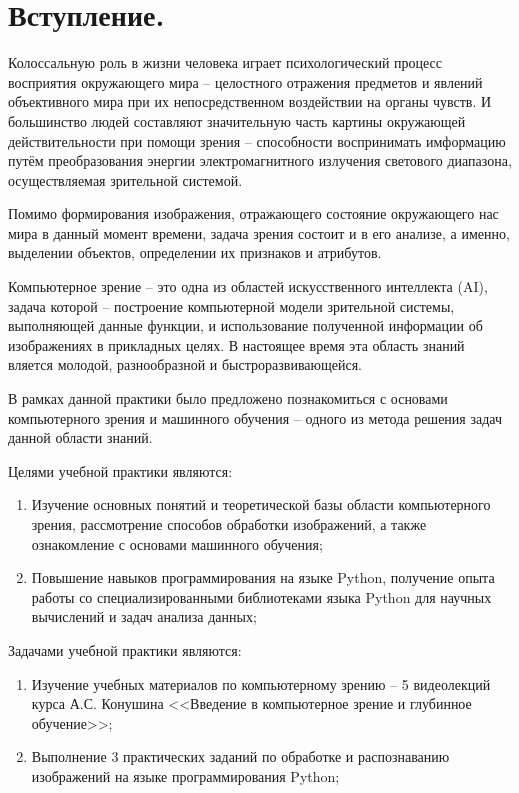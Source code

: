 \documentclass[a4paper, 12pt]{article}
\begin{document}
{
\hypersetup{linkcolor=black}
\tableofcontents
}

\newpage

\section*{Вступление.}
%

Колоссальную роль в жизни человека играет психологический процесс восприятия окружающего мира --  целостного отражения предметов и явлений объективного мира при их непосредственном воздействии на органы чувств. И большинство людей составляют значительную часть картины окружающей действительности при помощи зрения -- способности воспринимать имформацию путём преобразования энергии электромагнитного излучения светового диапазона, осуществляемая зрительной системой.

Помимо формирования изображения, отражающего состояние окружающего нас мира в данный момент времени, задача зрения состоит и в его анализе, а именно, выделении объектов, определении их признаков и атрибутов.

Компьютерное зрение -- это одна из областей искусственного интеллекта (AI), задача которой -- построение компьютерной модели зрительной системы, выполняющей данные функции, и использование полученной информации об изображениях в прикладных целях. В настоящее время эта область знаний вляется молодой, разнообразной и быстроразвивающейся.

В рамках данной практики было предложено познакомиться с основами компьютерного зрения и машинного обучения -- одного из метода решения задач данной области знаний.

Целями учебной практики являются:
\begin{enumerate}
\item Изучение основных понятий и теоретической базы области компьютерного зрения, рассмотрение способов обработки изображений, а также ознакомление с основами машинного обучения;
\item Повышение навыков программирования на языке Python, получение опыта работы со специализированными библиотеками языка Python для научных вычислений и задач анализа данных;
\end{enumerate}

Задачами учебной практики являются:
\begin{enumerate}
\item Изучение учебных материалов по компьютерному зрению -- 5 видеолекций курса А.С. Конушина <<Введение в компьютерное зрение и глубинное обучение>>;
\item Выполнение 3 практических заданий по обработке и распознаванию изображений на языке программирования Python;
\end{enumerate}
\end{document}
